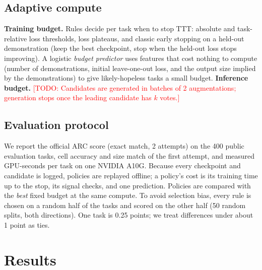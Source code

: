 \documentclass{article}
\newcommand{\todo}[1]{\textcolor{red}{[TODO: #1]}}
\begin{document}
\subsection{Adaptive compute}
\textbf{Training budget.} Rules decide per task when to stop TTT: absolute and task-relative loss thresholds, loss plateaus, and classic early stopping on a held-out demonstration (keep the best checkpoint, stop when the held-out loss stops improving). A logistic \emph{budget predictor} uses features that cost nothing to compute (number of demonstrations, initial leave-one-out loss, and the output size implied by the demonstrations) to give likely-hopeless tasks a small budget.
\textbf{Inference budget.} \todo{Candidates are generated in batches of 2 augmentations; generation stops once the leading candidate has $k$ votes.}

\subsection{Evaluation protocol}
We report the official ARC score (exact match, 2 attempts) on the 400 public evaluation tasks, cell accuracy and size match of the first attempt, and measured GPU-seconds per task on one NVIDIA A10G. Because every checkpoint and candidate is logged, policies are replayed offline; a policy's cost is its training time up to the stop, its signal checks, and one prediction. Policies are compared with the \emph{best} fixed budget at the same compute. To avoid selection bias, every rule is chosen on a random half of the tasks and scored on the other half (50 random splits, both directions). One task is 0.25 points; we treat differences under about 1 point as ties.

\section{Results}
\end{document}
